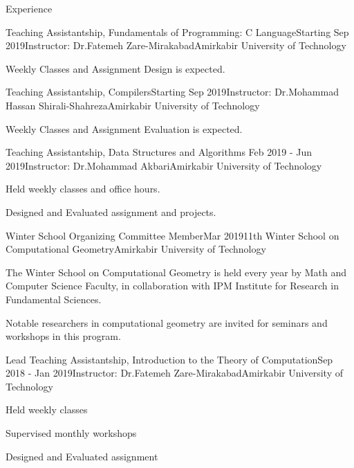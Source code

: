 \documentclass{resume} %
\begin{document}
	\begin{rSection}{Experience}
		\begin{rSubsection}{Teaching Assistantship, Fundamentals of Programming: C Language}{Starting Sep 2019}{Instructor: Dr.Fatemeh Zare-Mirakabad}{Amirkabir University of Technology}
		\item Weekly Classes and Assignment Design is expected.
		\end{rSubsection}					%
		\begin{rSubsection}{Teaching Assistantship, Compilers}{Starting Sep 2019}{Instructor: Dr.Mohammad Hassan Shirali-Shahreza}{Amirkabir University of Technology}
		\item Weekly Classes and Assignment Evaluation is expected.
		\end{rSubsection}					%
		\begin{rSubsection}{Teaching Assistantship, Data Structures and Algorithms }{Feb 2019 - Jun 2019}{Instructor: Dr.Mohammad Akbari}{Amirkabir University of Technology}
			\item 
			Held weekly classes and office hours.
			\item 
			Designed and Evaluated assignment and projects.
		\end{rSubsection}
		\begin{rSubsection}{Winter School Organizing Committee Member}{Mar 2019}{11th Winter School on Computational Geometry}{Amirkabir University of Technology}
			\item 	The Winter School on Computational Geometry is held every year by Math and Computer Science Faculty, in collaboration with IPM Institute for Research in Fundamental Sciences.
			\item Notable researchers in computational geometry are invited for seminars and workshops in this program.
		\end{rSubsection}
		
		
		
		\begin{rSubsection}{Lead Teaching Assistantship, Introduction to the Theory of Computation}{Sep 2018 - Jan 2019}{Instructor: Dr.Fatemeh Zare-Mirakabad}{Amirkabir University of Technology}
			\item Held weekly classes 
			\item Supervised monthly workshops
			\item Designed and Evaluated assignment 
			

\end{rSubsection}
\end{rSection}
\end{document}
